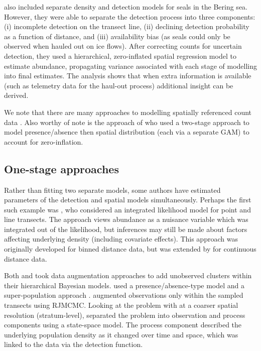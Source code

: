 \documentclass[a4paper,12pt]{article}
\begin{document}
\cite{VerHoef:2013ky} also included separate density and detection models for seals in the Bering sea. However, they were able to separate the detection process into three components: (i) incomplete detection on the transect line, (ii) declining detection probability as a function of distance, and (iii) availability bias (as seals could only be observed when hauled out on ice flows).  After correcting counts for uncertain detection, they used a hierarchical, zero-inflated spatial regression model to estimate abundance, propagating variance associated with each stage of modelling into final estimates. The analysis shows that when extra information is available (such as telemetry data for the haul-out process) additional insight can be derived.

We note that there are many approaches to modelling spatially referenced count data \citep[][provides an overview of such methods for marine bird modelling]{Oppel:2011tv}. Also worthy of note is the approach of \cite{Barry:2002bm} who used a two-stage approach to model presence/absence then spatial distribution (each via a separate GAM) to account for zero-inflation.

\subsection*{One-stage approaches}

Rather than fitting two separate models, some authors have estimated parameters of the detection and spatial models simultaneously. Perhaps the first such example was \cite{Royle:2004tu}, who considered an integrated likelihood model for point and line transects. The approach views abundance as a nuisance variable which was integrated out of the likelihood, but inferences may still be made about factors affecting underlying density (including covariate effects). This approach was originally developed for binned distance data, but was extended by \cite{Chelgren:2011us} for continuous distance data.

Both \cite{Schmidt:2011ec} and \cite{Conn:2012bx} took data augmentation approaches to add unobserved clusters within their hierarchical Bayesian models. \cite{Schmidt:2011ec} used a presence/absence-type model and a super-population approach \citep[as in][]{Royle:2008wc}. \cite{Conn:2012bx} augmented observations only within the sampled transects using RJMCMC. Looking at the problem with at a coarser spatial resolution (stratum-level), \cite{Moore:2011jf} separated the problem into observation and process components using a state-space model. The process component described the underlying population density as it changed over time and space, which was linked to the data via the detection function. 
\end{document}
